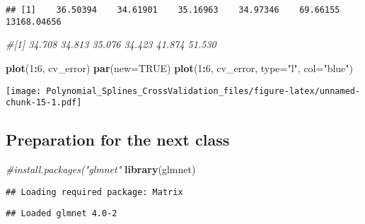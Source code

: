 \documentclass[
]{article}
\newenvironment{Shaded}{\begin{snugshade}}{\end{snugshade}}
\newcommand{\AttributeTok}[1]{\textcolor[rgb]{0.13,0.29,0.53}{#1}}
\newcommand{\CommentTok}[1]{\textcolor[rgb]{0.56,0.35,0.01}{\textit{#1}}}
\newcommand{\ConstantTok}[1]{\textcolor[rgb]{0.56,0.35,0.01}{#1}}
\newcommand{\DecValTok}[1]{\textcolor[rgb]{0.00,0.00,0.81}{#1}}
\newcommand{\FunctionTok}[1]{\textcolor[rgb]{0.13,0.29,0.53}{\textbf{#1}}}
\newcommand{\NormalTok}[1]{#1}
\newcommand{\SpecialCharTok}[1]{\textcolor[rgb]{0.81,0.36,0.00}{\textbf{#1}}}
\newcommand{\StringTok}[1]{\textcolor[rgb]{0.31,0.60,0.02}{#1}}
\begin{document}
\begin{verbatim}
## [1]    36.50394    34.61901    35.16963    34.97346    69.66155 13168.04656
\end{verbatim}

\begin{Shaded}
\begin{Highlighting}[]
\CommentTok{\#[1] 34.708 34.813 35.076 34.423 41.874 51.530}

\FunctionTok{plot}\NormalTok{(}\DecValTok{1}\SpecialCharTok{:}\DecValTok{6}\NormalTok{, cv\_error)}
\FunctionTok{par}\NormalTok{(}\AttributeTok{new=}\ConstantTok{TRUE}\NormalTok{)}
\FunctionTok{plot}\NormalTok{(}\DecValTok{1}\SpecialCharTok{:}\DecValTok{6}\NormalTok{, cv\_error, }\AttributeTok{type=}\StringTok{"l"}\NormalTok{, }\AttributeTok{col=}\StringTok{"blue"}\NormalTok{)}
\end{Highlighting}
\end{Shaded}

\texttt{[image: Polynomial\_Splines\_CrossValidation\_files/figure-latex/unnamed-chunk-15-1.pdf]}

\hypertarget{preparation-for-the-next-class}{%
\subsection{Preparation for the next
class}\label{preparation-for-the-next-class}}

\begin{Shaded}
\begin{Highlighting}[]
\CommentTok{\#install.packages("glmnet"}
\FunctionTok{library}\NormalTok{(glmnet)}
\end{Highlighting}
\end{Shaded}

\begin{verbatim}
## Loading required package: Matrix
\end{verbatim}

\begin{verbatim}
## Loaded glmnet 4.0-2
\end{verbatim}
\end{document}
